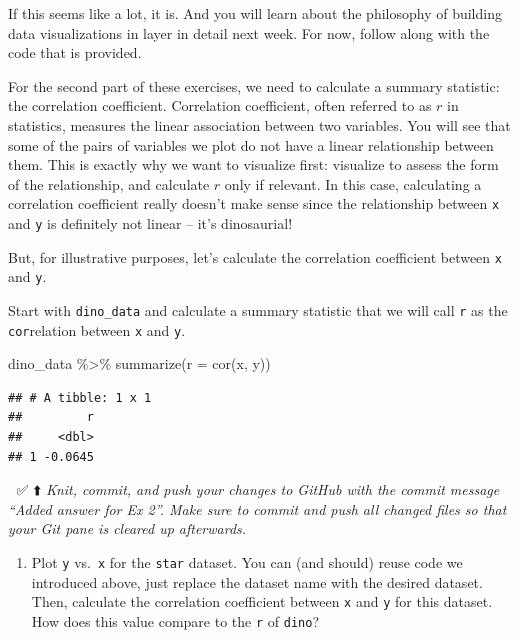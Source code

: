 \documentclass[]{tufte-handout}
\newenvironment{Shaded}{}{}
\newcommand{\AttributeTok}[1]{\textcolor[rgb]{0.49,0.56,0.16}{#1}}
\newcommand{\FunctionTok}[1]{\textcolor[rgb]{0.02,0.16,0.49}{#1}}
\newcommand{\NormalTok}[1]{#1}
\newcommand{\SpecialCharTok}[1]{\textcolor[rgb]{0.25,0.44,0.63}{#1}}
\providecommand{\tightlist}{%
  \setlength{\itemsep}{0pt}\setlength{\parskip}{0pt}}
\begin{document}
If this seems like a lot, it is. And you will learn about the philosophy
of building data visualizations in layer in detail next week. For now,
follow along with the code that is provided.

For the second part of these exercises, we need to calculate a summary
statistic: the correlation coefficient. Correlation coefficient, often
referred to as \(r\) in statistics, measures the linear association
between two variables. You will see that some of the pairs of variables
we plot do not have a linear relationship between them. This is exactly
why we want to visualize first: visualize to assess the form of the
relationship, and calculate \(r\) only if relevant. In this case,
calculating a correlation coefficient really doesn't make sense since
the relationship between \texttt{x} and \texttt{y} is definitely not
linear -- it's dinosaurial!

But, for illustrative purposes, let's calculate the correlation
coefficient between \texttt{x} and \texttt{y}.

\begin{marginfigure}
Start with \texttt{dino\_data} and calculate a summary statistic that we
will call \texttt{r} as the \texttt{cor}relation between \texttt{x} and
\texttt{y}.
\end{marginfigure}

\begin{Shaded}
\begin{Highlighting}[]
\NormalTok{dino\_data }\SpecialCharTok{\%\textgreater{}\%}
  \FunctionTok{summarize}\NormalTok{(}\AttributeTok{r =} \FunctionTok{cor}\NormalTok{(x, y))}
\end{Highlighting}
\end{Shaded}

\begin{verbatim}
## # A tibble: 1 x 1
##         r
##     <dbl>
## 1 -0.0645
\end{verbatim}

🧶 ✅ ⬆️ \emph{Knit, commit, and push your changes to GitHub with the
commit message ``Added answer for Ex 2''. Make sure to commit and push
all changed files so that your Git pane is cleared up afterwards.}

\begin{enumerate}
\def\labelenumi{\arabic{enumi}.}
\setcounter{enumi}{2}
\tightlist
\item
  Plot \texttt{y} vs.~\texttt{x} for the \texttt{star} dataset. You can
  (and should) reuse code we introduced above, just replace the dataset
  name with the desired dataset. Then, calculate the correlation
  coefficient between \texttt{x} and \texttt{y} for this dataset. How
  does this value compare to the \texttt{r} of \texttt{dino}?
\end{enumerate}
\end{document}
